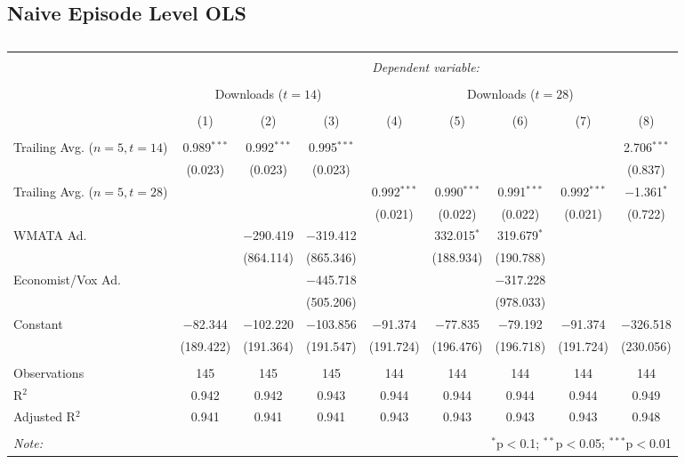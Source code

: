 \documentclass[11pt, letterpaper, twoside]{article}
\begin{document}
\subsection{Naive Episode Level OLS}

\begin{landscape}
    \thispagestyle{empty}
    \begin{table}[!htbp] \centering
        \caption{}
        \label{}
      \begin{tabular}{@{\extracolsep{5pt}}lcccccccc} 
      \\[-1.8ex]\hline
      \hline \\[-1.8ex]
       & \multicolumn{8}{c}{\textit{Dependent variable:}} \\
      \cline{2-9} 
      \\[-1.8ex] & \multicolumn{3}{c}{Downloads ($t=14$)} & \multicolumn{5}{c}{Downloads ($t=28$)} \\       
      \\[-1.8ex] & (1) & (2) & (3) & (4) & (5) & (6) & (7) & (8)\\ 
      \hline \\[-1.8ex]
       Trailing Avg. ($n=5, t=14$) & 0.989$^{***}$ & 0.992$^{***}$ & 0.995$^{***}$ &  &  &  &  & 2.706$^{***}$ \\
        & (0.023) & (0.023) & (0.023) &  &  &  &  & (0.837) \\
        Trailing Avg. ($n=5, t=28$) &  &  &  & 0.992$^{***}$ & 0.990$^{***}$ & 0.991$^{***}$ & 0.992$^{***}$ & $-$1.361$^{*}$ \\
        &  &  &  & (0.021) & (0.022) & (0.022) & (0.021) & (0.722) \\ 
        WMATA Ad. &  & $-$290.419 & $-$319.412 &  & 332.015$^{*}$ & 319.679$^{*}$ &  &  \\
        &  & (864.114) & (865.346) &  & (188.934) & (190.788) &  &  \\
        Economist/Vox Ad. &  &  & $-$445.718 &  &  & $-$317.228 &  &  \\ 
        &  &  & (505.206) &  &  & (978.033) &  &  \\
        Constant & $-$82.344 & $-$102.220 & $-$103.856 & $-$91.374 & $-$77.835 & $-$79.192 & $-$91.374 & $-$326.518 \\
        & (189.422) & (191.364) & (191.547) & (191.724) & (196.476) & (196.718) & (191.724) & (230.056) \\  
       \hline \\[-1.8ex]
      Observations & 145 & 145 & 145 & 144 & 144 & 144 & 144 & 144 \\ 
      R$^{2}$ & 0.942 & 0.942 & 0.943 & 0.944 & 0.944 & 0.944 & 0.944 & 0.949 \\
      Adjusted R$^{2}$ & 0.941 & 0.941 & 0.941 & 0.943 & 0.943 & 0.943 & 0.943 & 0.948 \\ 
      \hline
      \hline \\[-1.8ex]
      \textit{Note:}  & \multicolumn{8}{r}{$^{*}$p$<$0.1; $^{**}$p$<$0.05; $^{***}$p$<$0.01} \\
      \end{tabular}
      \end{table}
\end{landscape}    
\end{document}
